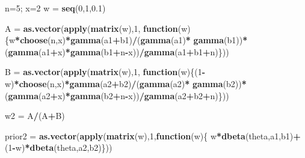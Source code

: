 \documentclass[
]{book}
\newenvironment{Shaded}{\begin{snugshade}}{\end{snugshade}}
\newcommand{\ControlFlowTok}[1]{\textcolor[rgb]{0.13,0.29,0.53}{\textbf{#1}}}
\newcommand{\DecValTok}[1]{\textcolor[rgb]{0.00,0.00,0.81}{#1}}
\newcommand{\FloatTok}[1]{\textcolor[rgb]{0.00,0.00,0.81}{#1}}
\newcommand{\KeywordTok}[1]{\textcolor[rgb]{0.13,0.29,0.53}{\textbf{#1}}}
\newcommand{\NormalTok}[1]{#1}
\newcommand{\OperatorTok}[1]{\textcolor[rgb]{0.81,0.36,0.00}{\textbf{#1}}}
\newcommand{\StringTok}[1]{\textcolor[rgb]{0.31,0.60,0.02}{#1}}
\begin{document}
\begin{Shaded}
\begin{Highlighting}[]
\NormalTok{n=}\DecValTok{5}\NormalTok{; x=}\DecValTok{2}
\NormalTok{w =}\StringTok{ }\KeywordTok{seq}\NormalTok{(}\DecValTok{0}\NormalTok{,}\DecValTok{1}\NormalTok{,}\FloatTok{0.1}\NormalTok{)}

\NormalTok{A =}\StringTok{ }\KeywordTok{as.vector}\NormalTok{(}\KeywordTok{apply}\NormalTok{(}\KeywordTok{matrix}\NormalTok{(w),}\DecValTok{1}\NormalTok{,}
  \ControlFlowTok{function}\NormalTok{(w)\{w}\OperatorTok{*}\KeywordTok{choose}\NormalTok{(n,x)}\OperatorTok{*}\KeywordTok{gamma}\NormalTok{(a1}\OperatorTok{+}\NormalTok{b1)}\OperatorTok{/}\NormalTok{(}\KeywordTok{gamma}\NormalTok{(a1)}\OperatorTok{*}
\StringTok{    }\KeywordTok{gamma}\NormalTok{(b1))}\OperatorTok{*}\NormalTok{(}\KeywordTok{gamma}\NormalTok{(a1}\OperatorTok{+}\NormalTok{x)}\OperatorTok{*}\KeywordTok{gamma}\NormalTok{(b1}\OperatorTok{+}\NormalTok{n}\OperatorTok{-}\NormalTok{x))}\OperatorTok{/}\KeywordTok{gamma}\NormalTok{(a1}\OperatorTok{+}\NormalTok{b1}\OperatorTok{+}\NormalTok{n)\}))}

\NormalTok{B =}\StringTok{ }\KeywordTok{as.vector}\NormalTok{(}\KeywordTok{apply}\NormalTok{(}\KeywordTok{matrix}\NormalTok{(w),}\DecValTok{1}\NormalTok{,}
  \ControlFlowTok{function}\NormalTok{(w)\{(}\DecValTok{1}\OperatorTok{-}\NormalTok{w)}\OperatorTok{*}\KeywordTok{choose}\NormalTok{(n,x)}\OperatorTok{*}\KeywordTok{gamma}\NormalTok{(a2}\OperatorTok{+}\NormalTok{b2)}\OperatorTok{/}\NormalTok{(}\KeywordTok{gamma}\NormalTok{(a2)}\OperatorTok{*}
\StringTok{    }\KeywordTok{gamma}\NormalTok{(b2))}\OperatorTok{*}\NormalTok{(}\KeywordTok{gamma}\NormalTok{(a2}\OperatorTok{+}\NormalTok{x)}\OperatorTok{*}\KeywordTok{gamma}\NormalTok{(b2}\OperatorTok{+}\NormalTok{n}\OperatorTok{-}\NormalTok{x))}\OperatorTok{/}\KeywordTok{gamma}\NormalTok{(a2}\OperatorTok{+}\NormalTok{b2}\OperatorTok{+}\NormalTok{n)\}))}

\NormalTok{w2 =}\StringTok{ }\NormalTok{A}\OperatorTok{/}\NormalTok{(A}\OperatorTok{+}\NormalTok{B)}

\NormalTok{prior2 =}\StringTok{ }\KeywordTok{as.vector}\NormalTok{(}\KeywordTok{apply}\NormalTok{(}\KeywordTok{matrix}\NormalTok{(w),}\DecValTok{1}\NormalTok{,}\ControlFlowTok{function}\NormalTok{(w)\{}
\NormalTok{  w}\OperatorTok{*}\KeywordTok{dbeta}\NormalTok{(theta,a1,b1)}\OperatorTok{+}\NormalTok{(}\DecValTok{1}\OperatorTok{-}\NormalTok{w)}\OperatorTok{*}\KeywordTok{dbeta}\NormalTok{(theta,a2,b2)\}))}


\end{Highlighting}
\end{Shaded}
\end{document}

